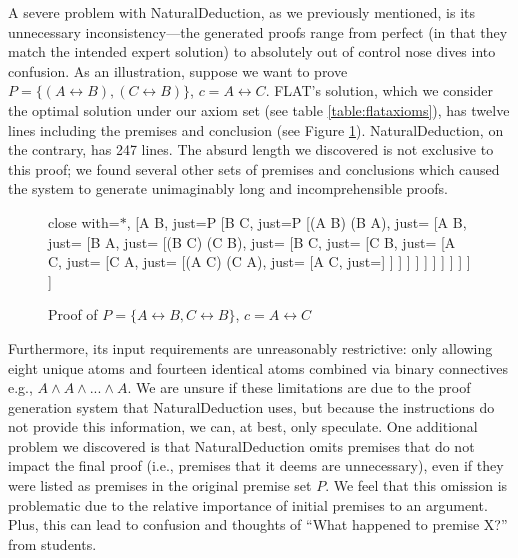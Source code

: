 \documentclass[ms]{uncgdissertationexp2}
\theoremstyle{plain}
\theoremstyle{definition}
\theoremstyle{remark}
\begin{document}
A severe problem with NaturalDeduction, as we previously mentioned, is its unnecessary inconsistency---the generated proofs range from perfect (in that they match the intended expert solution) to absolutely out of control nose dives into confusion. As an illustration, suppose we want to prove $P = \{(A \leftrightarrow B), (C \leftrightarrow B)\}$, $c = A\leftrightarrow C$. FLAT's solution, which we consider the optimal solution under our axiom set (see table \ref{table:flataxioms}), has twelve lines including the premises and conclusion (see Figure \ref{fig:long-ass-proof}). NaturalDeduction, on the contrary, has 247 lines. The absurd length we discovered is not exclusive to this proof; we found several other sets of premises and conclusions which caused the system to generate unimaginably long and incomprehensible proofs. 
\begin{figure}[!ht]
	\caption{Proof of $P = \{A \leftrightarrow B, C \leftrightarrow B\}$, $c = A\leftrightarrow C$}
	\label{fig:long-ass-proof}
	\begin{center}
	\renewcommand*\linenumberstyle[1]{#1.}
		\begin{prooftree}
			{
			close with={\ensuremath{\ast}},
			}
			[A \leftrightarrow B, just=P
				[B \leftrightarrow C, just=P
					[(A \to B) \land (B \to A), just= %
						[A \to B, just= %
							[B \to A, just= %
								[(B \to C) \land (C \to B), just=\text{2 BCB} %
									[B \to C, just=\text{6 $\land$E} %
										[C \to B, just= %
											[A \to C, just=\text{4, 7 HS} %
												[C \to A, just=\text{3, 8 HS} %
													[(A \to C) \land (C \to A), just=\text{9, 10 $\land$I} %
														[A \leftrightarrow C, just=] %
													]
												]
											]
										]
									]
								]
							]
						]
					]
				]
			]
		\end{prooftree}
	\end{center}
\end{figure}
Furthermore, its input requirements are unreasonably restrictive: only allowing eight unique atoms and fourteen identical atoms combined via binary connectives e.g., $A\land A\land ... \land A$. We are unsure if these limitations are due to the proof generation system that NaturalDeduction uses, but because the instructions do not provide this information, we can, at best, only speculate. One additional problem we discovered is that NaturalDeduction omits premises that do not impact the final proof (i.e., premises that it deems are unnecessary), even if they were listed as premises in the original premise set $P$. We feel that this omission is problematic due to the relative importance of initial premises to an argument. Plus, this can lead to confusion and thoughts of ``What happened to premise X?'' from students.
\end{document}
